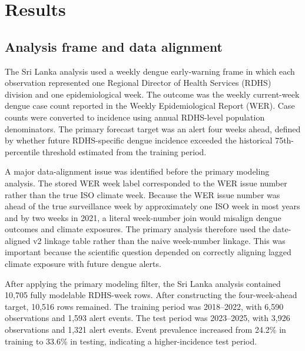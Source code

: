 \documentclass[11pt,a4paper]{article}
\begin{document}
\section{Results}
\label{sec:results}

\subsection{Analysis frame and data alignment}
\label{subsec:analysis-frame}

The Sri Lanka analysis used a weekly dengue early-warning frame in which each observation represented one Regional Director of Health Services (RDHS) division and one epidemiological week. The outcome was the weekly current-week dengue case count reported in the Weekly Epidemiological Report (WER). Case counts were converted to incidence using annual RDHS-level population denominators. The primary forecast target was an alert four weeks ahead, defined by whether future RDHS-specific dengue incidence exceeded the historical 75th-percentile threshold estimated from the training period.

A major data-alignment issue was identified before the primary modeling analysis. The stored WER week label corresponded to the WER issue number rather than the true ISO climate week. Because the WER issue number was ahead of the true surveillance week by approximately one ISO week in most years and by two weeks in 2021, a literal week-number join would misalign dengue outcomes and climate exposures. The primary analysis therefore used the date-aligned v2 linkage table rather than the naive week-number linkage. This was important because the scientific question depended on correctly aligning lagged climate exposure with future dengue alerts.

After applying the primary modeling filter, the Sri Lanka analysis contained 10,705 fully modelable RDHS-week rows. After constructing the four-week-ahead target, 10,516 rows remained. The training period was 2018--2022, with 6,590 observations and 1,593 alert events. The test period was 2023--2025, with 3,926 observations and 1,321 alert events. Event prevalence increased from 24.2\% in training to 33.6\% in testing, indicating a higher-incidence test period.

\end{document}
